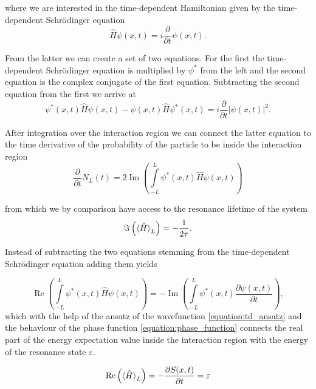 where we are interested in the time-dependent Hamiltonian
given by the time-dependent Schrödinger equation
\begin{equation}
  \hat{H}\psi(x,t) = i \frac{\partial}{\partial t} \psi(x,t) .
\end{equation}

From the latter we can create a set of two equations. For the first
the time-dependent Schrödinger equation is multiplied by $\psi^*$ from the
left and the second equation is the complex conjugate of the first equation.
Subtracting the second equation from the first we arrive at
\begin{equation}
  \psi^*(x,t) \hat{H} \psi(x,t) - \psi(x,t) \hat{H} \psi^*(x,t) = 
      i \frac{\partial}{\partial t} |\psi(x,t)|^2    .
\end{equation}

After integration over the interaction region we can connect the latter equation
to the time derivative of the probability of the particle to be inside the
interaction region
\begin{equation}
  \frac{\partial}{\partial t} N_L(t) = 2 \operatorname{Im} \left(
       \int\limits_{-L}^L \psi^*(x,t) \hat{H} \psi(x,t) \right)
\end{equation}

from which we by comparison have access to the resonance lifetime of the system
\begin{equation}
  \Im \left( \braket{\hat{H}}_L \right) = -\frac{1}{2\tau}   .
\end{equation}

Instead of subtracting the two equations stemming from the time-dependent
Schrödinger equation adding them yields

\begin{equation}
  \operatorname{Re} \left( \int\limits_{-L}^L \psi^*(x,t) \hat{H} \psi(x,t) \right)
 = -\operatorname{Im} \left( \int\limits_{-L}^L \psi^*(x,t)
    \frac{\partial \psi(x,t)}{\partial t} \right)   ,
\end{equation}
which with the help of the ansatz of the wavefunction \ref{equation:td_ansatz}
and the behaviour of the phase function \ref{equation:phase_function}
connects the real part of the energy expectation value inside the interaction
region with the energy of the resonance state $\varepsilon$.

\begin{equation}
  \operatorname{Re} \left( \braket{\hat{H}}_L \right)
  = -\frac{\partial S(x,t)}{\partial t}
  = \varepsilon
\end{equation}

